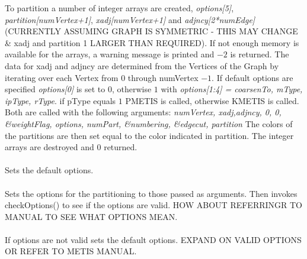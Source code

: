 To partition a number of integer arrays are created, {\em options[5]},
{\em partition[numVertex+1]}, {\em xadj[numVertex+1]} and {\em
adjncy[2*numEdge]} (CURRENTLY ASSUMING GRAPH IS SYMMETRIC - THIS MAY
CHANGE \& xadj and partition 1 LARGER THAN REQUIRED). If not enough
memory is available for the arrays, a warning message is printed and
$-2$ is returned. The data for \p xadj and \p adjncy are
determined from the Vertices of the Graph by iterating over each
Vertex from $0$ through \p numVertex $-1$. If default options are
specified {\em options[0]} is set to $0$, otherwise $1$ with {\em
options[1:4] = coarsenTo, mType, ipType, rType}. if \p pType equals
$1$ \p PMETIS is called, otherwise \p KMETIS is called. Both are
called with the following arguments: {\em numVertex, xadj,adjncy, 0,
0, \&weightFlag, options, numPart, \&numbering, \&edgecut, partition} 
The colors of the partitions are then set equal to the color indicated
in \p partition.  The integer arrays are destroyed and $0$
returned. \\

\\
Sets the default options. \\

  \\ 
Sets the options for the partitioning to those passed as
arguments. Then invokes checkOptions() to see if the options are
valid. HOW ABOUT REFERRINGR TO MANUAL TO SEE WHAT OPTIONS MEAN. \\

  \\
If options are not valid sets the default options. EXPAND ON VALID
OPTIONS OR REFER TO METIS MANUAL. \\
